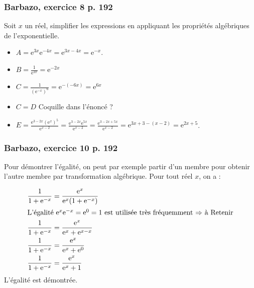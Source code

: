 \documentclass[11pt, hyperref={urlcolor=red,%
            linkcolor=blue, %
            colorlinks=true}]{beamer}
\begin{document}
\begin{frame}
\frametitle{Barbazo, exercice 8 p. 192}
\label{exo8}

Soit $x$ un réel, simplifier les expressions en appliquant les propriétés algébriques de l'exponentielle.

\begin{itemize}
	\item $A=\text{e}^{3x}\text{e}^{-4x}=\text{e}^{3x-4x}=\text{e}^{-x}$. 
	\item $B=\frac{1}{\text{e}^{2x}}=\text{e}^{-2x}$
	\item $C=\frac{1}{\left(\text{e}^{-x}\right)^{6}}=\text{e}^{-(-6x)}=\text{e}^{6x}$
	\item $C=D$ Coquille dans l'énoncé ?
	\item $E=\frac{\text{e}^{3-2x} \left(\text{e}^{x}\right)^{5}}{\text{e}^{x-2}}=\frac{\text{e}^{3-2x} \text{e}^{5x}}{\text{e}^{x-2}}=\frac{\text{e}^{3-2x+5x}}{\text{e}^{x-2}}=\text{e}^{3x+3-(x-2)}=\text{e}^{2x+5}$.
\end{itemize}
\end{frame}



\begin{frame}
\frametitle{Barbazo, exercice 10 p. 192}
\label{exo10}

Pour démontrer l'égalité, on peut par exemple partir d'un membre pour obtenir l'autre membre par transformation algébrique. Pour tout réel $x$, on a :

\begin{align*}
	\frac{1}{1+\text{e}^{-x}} &=\frac{\text{e}^{x}}{\text{e}^{x}(1+\text{e}^{-x})} \\
	\intertext{L'égalité $\text{e}^{x}\text{e}^{-x}=\text{e}^{0}=1$ est utilisée très fréquemment $\Rightarrow$ à Retenir}
	\frac{1}{1+\text{e}^{-x}} &=\frac{\text{e}^{x}}{\text{e}^{x} +\text{e}^{x-x}} \\
	\frac{1}{1+\text{e}^{-x}} &=\frac{\text{e}^{x}}{\text{e}^{x} +\text{e}^{0}} \\
		\frac{1}{1+\text{e}^{-x}} &=\frac{\text{e}^{x}}{\text{e}^{x} +1}
\end{align*}
L'égalité est démontrée.


\end{frame}
\end{document}

